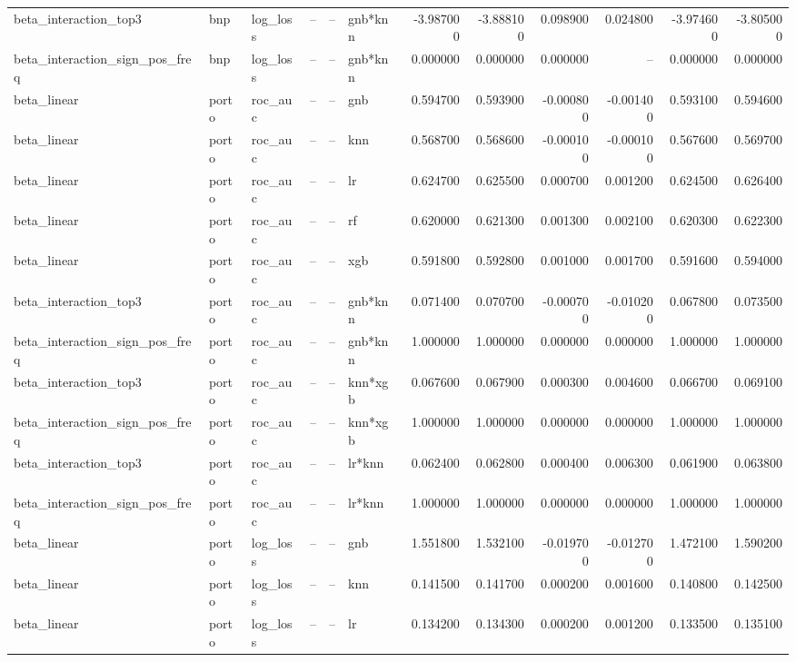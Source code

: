 \begin{landscape}
\begin{longtable}{llllllrrrrrr}
beta\_interaction\_top3 & bnp & log\_loss & -- & -- & gnb*knn & -3.987000 & -3.888100 & 0.098900 & 0.024800 & -3.974600 & -3.805000 \\
beta\_interaction\_sign\_pos\_freq & bnp & log\_loss & -- & -- & gnb*knn & 0.000000 & 0.000000 & 0.000000 & -- & 0.000000 & 0.000000 \\
beta\_linear & porto & roc\_auc & -- & -- & gnb & 0.594700 & 0.593900 & -0.000800 & -0.001400 & 0.593100 & 0.594600 \\
beta\_linear & porto & roc\_auc & -- & -- & knn & 0.568700 & 0.568600 & -0.000100 & -0.000100 & 0.567600 & 0.569700 \\
beta\_linear & porto & roc\_auc & -- & -- & lr & 0.624700 & 0.625500 & 0.000700 & 0.001200 & 0.624500 & 0.626400 \\
beta\_linear & porto & roc\_auc & -- & -- & rf & 0.620000 & 0.621300 & 0.001300 & 0.002100 & 0.620300 & 0.622300 \\
beta\_linear & porto & roc\_auc & -- & -- & xgb & 0.591800 & 0.592800 & 0.001000 & 0.001700 & 0.591600 & 0.594000 \\
beta\_interaction\_top3 & porto & roc\_auc & -- & -- & gnb*knn & 0.071400 & 0.070700 & -0.000700 & -0.010200 & 0.067800 & 0.073500 \\
beta\_interaction\_sign\_pos\_freq & porto & roc\_auc & -- & -- & gnb*knn & 1.000000 & 1.000000 & 0.000000 & 0.000000 & 1.000000 & 1.000000 \\
beta\_interaction\_top3 & porto & roc\_auc & -- & -- & knn*xgb & 0.067600 & 0.067900 & 0.000300 & 0.004600 & 0.066700 & 0.069100 \\
beta\_interaction\_sign\_pos\_freq & porto & roc\_auc & -- & -- & knn*xgb & 1.000000 & 1.000000 & 0.000000 & 0.000000 & 1.000000 & 1.000000 \\
beta\_interaction\_top3 & porto & roc\_auc & -- & -- & lr*knn & 0.062400 & 0.062800 & 0.000400 & 0.006300 & 0.061900 & 0.063800 \\
beta\_interaction\_sign\_pos\_freq & porto & roc\_auc & -- & -- & lr*knn & 1.000000 & 1.000000 & 0.000000 & 0.000000 & 1.000000 & 1.000000 \\
beta\_linear & porto & log\_loss & -- & -- & gnb & 1.551800 & 1.532100 & -0.019700 & -0.012700 & 1.472100 & 1.590200 \\
beta\_linear & porto & log\_loss & -- & -- & knn & 0.141500 & 0.141700 & 0.000200 & 0.001600 & 0.140800 & 0.142500 \\
beta\_linear & porto & log\_loss & -- & -- & lr & 0.134200 & 0.134300 & 0.000200 & 0.001200 & 0.133500 & 0.135100 \\

\end{longtable}
\end{landscape}
